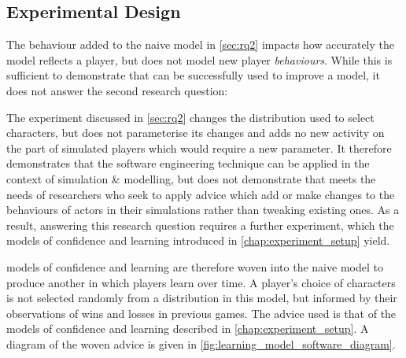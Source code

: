 \subsection{Experimental Design}

The behaviour added to the naive model in \cref{sec:rq2} impacts how accurately
the model reflects a player, but does not model new player \emph{behaviours}.
While this is sufficient to demonstrate that \aop{} can be successfully used to
improve a model, it does not answer the second research question:

\begin{researchquestion}
\rqtwo{}
\end{researchquestion}


The experiment discussed in \cref{sec:rq2} changes the distribution used to
select characters, but does not parameterise its changes and adds no new
activity on the part of simulated players which would require a new parameter.
It therefore demonstrates that the software engineering technique can be applied
in the context of simulation \& modelling, but does not demonstrate that \aop
meets the needs of researchers who seek to apply advice which add or make changes to
the behaviours of actors in their simulations rather than tweaking existing
ones. As a result, answering this research question requires a further
experiment, which the \aspectoriented models of confidence and learning
introduced in \cref{chap:experiment_setup} yield.

\Aspectoriented{} models of confidence and learning are therefore woven into the naive model to
produce another in which players learn over time. A player's choice of
characters is not selected randomly from a distribution in this model, but
informed by their observations of wins and losses in previous games. The advice
used is that of the models of confidence and learning described in
\cref{chap:experiment_setup}. A diagram of the woven advice is given in
\cref{fig:learning_model_software_diagram}.

